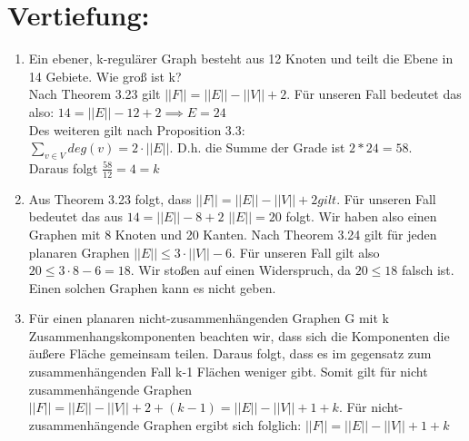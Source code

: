 



    \maketitle
    \section*{Vertiefung:}
    \begin{enumerate}[label=(\alph*)]
        \item  Ein ebener,
        k-regulärer Graph besteht aus
        12 Knoten und teilt die Ebene in
        14 Gebiete. Wie groß ist k? \\
        Nach Theorem 3.23 gilt $||F|| = ||E|| - ||V|| + 2$. Für unseren Fall bedeutet das also:
        $14 = ||E|| - 12 + 2 \implies E = 24$ \\
        Des weiteren gilt nach Proposition 3.3: \\
        $\sum_{v \in V} deg(v) = 2 \cdot ||E||$. D.h. die Summe der Grade ist $2 * 24 = 58$. \\
        Daraus folgt $\frac{58}{12} = 4 = k$
        
        \item Aus Theorem 3.23 folgt, dass $||F|| = ||E|| - ||V|| + 2 gilt $. Für unseren Fall bedeutet das aus $ 14 = ||E|| - 8 + 2 $ $ ||E|| = 20 $ folgt. Wir haben also einen Graphen mit 8 Knoten und 20 Kanten. Nach Theorem 3.24 gilt für jeden planaren Graphen $ ||E|| \leq 3 \cdot ||V|| - 6$. Für unseren Fall gilt also $20 \leq 3 \cdot 8 - 6  = 18$.
        Wir stoßen auf einen Widerspruch, da $20 \leq 18$ falsch ist. Einen solchen Graphen kann es nicht geben.
        
        
        \item Für einen planaren nicht-zusammenhängenden Graphen G mit k Zusammenhangskomponenten beachten wir, dass sich die Komponenten die äußere Fläche gemeinsam teilen. Daraus folgt, dass es im gegensatz zum zusammenhängenden Fall k-1 Flächen weniger gibt. Somit gilt für nicht zusammenhängende Graphen $||F|| = ||E|| - ||V|| + 2 + (k-1) = ||E|| - ||V|| + 1 + k$. Für nicht-zusammenhängende Graphen ergibt sich folglich:
        $||F|| = ||E|| - ||V|| + 1 + k $
       

\end{enumerate}
